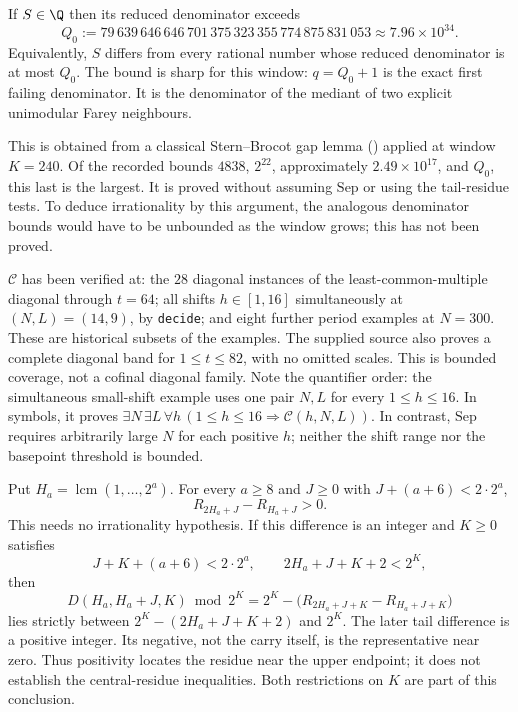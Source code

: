 \begin{thm}
\label{thm:denom}
If $S \in \Q$ then its reduced denominator exceeds
\[
Q_0 := 79\,639\,646\,646\,701\,375\,323\,355\,774\,875\,831\,053 \approx 7.96 \times 10^{34}.
\]
Equivalently, $S$ differs from every rational number whose reduced
denominator is at most $Q_0$.
The bound is sharp for this window: $q = Q_0 + 1$ is the exact first failing
denominator. It is the denominator of the mediant of two explicit
unimodular Farey neighbours.
\end{thm}

This is obtained from a classical Stern--Brocot gap lemma
() applied at window $K = 240$.
Of the recorded bounds $4838$, $2^{22}$, approximately
$2.49\times10^{17}$, and $Q_0$, this last is the largest. It is
proved without assuming $\mathrm{Sep}$ or using the tail-residue tests.
To deduce irrationality by this argument, the analogous denominator bounds
would have to be unbounded as the window grows; this has not been proved.

\begin{prop}
\label{prop:deposits}
$\mathcal{C}$ has been verified at: the $28$ diagonal instances of
the least-common-multiple diagonal through $t = 64$;
all shifts $h \in [1,16]$ simultaneously at $(N,L) = (14,9)$, by
\texttt{decide};
and eight further period examples at $N = 300$. These are historical
subsets of the examples. The supplied source also proves a complete diagonal band for
$1\le t\le82$, with no omitted scales.
This is bounded coverage, not a cofinal diagonal family.
Note the quantifier order: the simultaneous small-shift example
uses one pair $N,L$ for every $1\le h\le16$. In symbols, it proves
$\exists N\,\exists L\,\forall h\,(1\le h\le16\Rightarrow\mathcal C(h,N,L))$.
In contrast, $\mathrm{Sep}$ requires arbitrarily large $N$ for each
positive $h$; neither the shift range nor the basepoint threshold is bounded.
\end{prop}

\begin{prop}
\label{prop:sign}
Put $H_a=\operatorname{lcm}(1,\ldots,2^a)$. For every $a\ge8$ and
$J\ge0$ with $J+(a+6)<2\cdot2^a$,
\[
 R_{2H_a+J}-R_{H_a+J}>0.
\]
This needs no irrationality hypothesis.
If this difference is an integer and $K\ge0$ satisfies
\[
 J+K+(a+6)<2\cdot2^a,\qquad 2H_a+J+K+2<2^K,
\]
then
\[
 D(H_a,H_a+J,K)\bmod2^K
   =2^K-\bigl(R_{2H_a+J+K}-R_{H_a+J+K}\bigr)
\]
lies strictly between $2^K-(2H_a+J+K+2)$ and $2^K$. The later tail difference is a positive integer.
Its negative, not the carry itself, is the representative near zero.
Thus positivity locates the residue near the upper endpoint; it does not
establish the central-residue inequalities. Both restrictions on $K$ are
part of this conclusion.
\end{prop}


